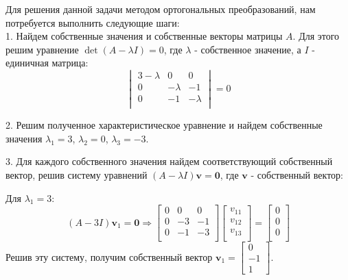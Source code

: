 \documentclass{article}
\begin{document}
Для решения данной задачи методом ортогональных преобразований, нам потребуется выполнить следующие шаги:
\\

1. Найдем собственные значения и собственные векторы матрицы \(A\). Для этого решим уравнение \(\det(A - \lambda I) = 0\), где \(\lambda\) - собственное значение, а \(I\) - единичная матрица:
\[
\begin{vmatrix}
3 - \lambda & 0 & 0 \\
0 & -\lambda & -1 \\
0 & -1 & -\lambda \\
\end{vmatrix}
= 0
\]

2. Решим полученное характеристическое уравнение и найдем собственные значения \(\lambda_1 = 3\), \(\lambda_2 = 0\), \(\lambda_3 = -3\).

3. Для каждого собственного значения найдем соответствующий собственный вектор, решив систему уравнений \((A - \lambda I) \mathbf{v} = \mathbf{0}\), где \(\mathbf{v}\) - собственный вектор:
   
   Для \(\lambda_1 = 3\):
   \[
   (A - 3I) \mathbf{v}_1 = \mathbf{0} \Rightarrow
   \begin{bmatrix}
   0 & 0 & 0 \\
   0 & -3 & -1 \\
   0 & -1 & -3 \\
   \end{bmatrix}
   \begin{bmatrix}
   v_{11} \\
   v_{12} \\
   v_{13} \\
   \end{bmatrix}
   =
   \begin{bmatrix}
   0 \\
   0 \\
   0 \\
   \end{bmatrix}
   \]
   Решив эту систему, получим собственный вектор \(\mathbf{v}_1 = \begin{bmatrix} 0 \\ -1 \\ 1 \end{bmatrix}\).
\end{document}
